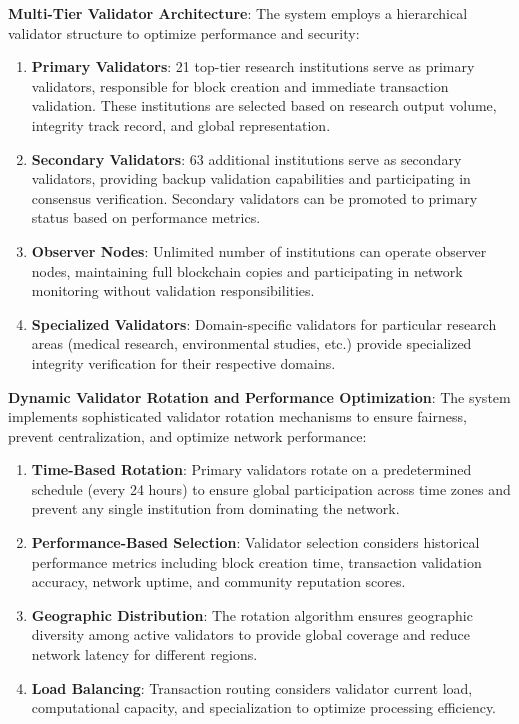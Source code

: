\documentclass[10pt,twocolumn]{article}
\begin{document}
\textbf{Multi-Tier Validator Architecture}: The system employs a hierarchical validator structure to optimize performance and security:

\begin{enumerate}
    \item \textbf{Primary Validators}: 21 top-tier research institutions serve as primary validators, responsible for block creation and immediate transaction validation. These institutions are selected based on research output volume, integrity track record, and global representation.
    
    \item \textbf{Secondary Validators}: 63 additional institutions serve as secondary validators, providing backup validation capabilities and participating in consensus verification. Secondary validators can be promoted to primary status based on performance metrics.
    
    \item \textbf{Observer Nodes}: Unlimited number of institutions can operate observer nodes, maintaining full blockchain copies and participating in network monitoring without validation responsibilities.
    
    \item \textbf{Specialized Validators}: Domain-specific validators for particular research areas (medical research, environmental studies, etc.) provide specialized integrity verification for their respective domains.
\end{enumerate}

\textbf{Dynamic Validator Rotation and Performance Optimization}: The system implements sophisticated validator rotation mechanisms to ensure fairness, prevent centralization, and optimize network performance:

\begin{enumerate}
    \item \textbf{Time-Based Rotation}: Primary validators rotate on a predetermined schedule (every 24 hours) to ensure global participation across time zones and prevent any single institution from dominating the network.
    
    \item \textbf{Performance-Based Selection}: Validator selection considers historical performance metrics including block creation time, transaction validation accuracy, network uptime, and community reputation scores.
    
    \item \textbf{Geographic Distribution}: The rotation algorithm ensures geographic diversity among active validators to provide global coverage and reduce network latency for different regions.
    
    \item \textbf{Load Balancing}: Transaction routing considers validator current load, computational capacity, and specialization to optimize processing efficiency.
\end{enumerate}
\end{document}
